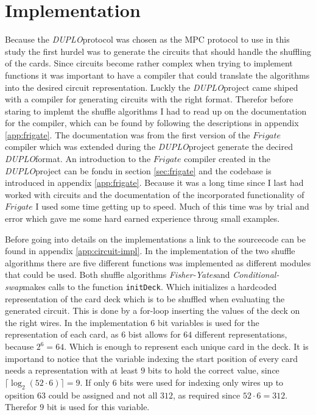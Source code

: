 \documentclass[twoside,11pt,openright]{report}
\newcommand{\FY}{\textit{Fisher-Yates}}
\newcommand{\CS}{\textit{Conditional-swap}}
\newcommand{\DUPLO}{\textit{DUPLO}}
\begin{document}
\section{Implementation}
\label{sec:cir_imp}
Because the \DUPLO protocol was chosen as the MPC protocol to use in this study the first hurdel was to generate the circuits that should handle the shuffling of the cards. Since circuits become rather complex when trying to implement functions it was important to have a compiler that could translate the algorithms into the desired circuit representation. Luckly the \DUPLO project came shiped with a compiler for generating circuits with the right format. Therefor before staring to implemt the shuffle algorithms I had to read up on the documentation for the compiler, which can be found by following the descriptions in appendix \ref{app:frigate}. The documentation was from the first version of the $Frigate$ compiler which was extended during the \DUPLO project generate the decired \DUPLO format. An introduction to the $Frigate$ compiler created in the \DUPLO project can be fondu in section \ref{sec:frigate} and the codebase is introduced in appendix \ref{app:frigate}. Because it was a long time since I last had worked with circuits and the documentation of the incorporated functionality of $Frigate$ I used some time getting up to speed. Much of this time was by trial and error which gave me some hard earned experience throug small examples.

\bigskip

Before going into details on the implementations a link to the sourcecode can be found in appendix \ref{app:circuit-impl}. In the implementation of the two shuffle algorithms there are five different functions was implemented as different modules that could be used. Both shuffle algorithms \FY and \CS makes calls to the function \verb|initDeck|. Which initializes a hardcoded representation of the card deck which is to be shuffled when evaluating the generated circuit. This is done by a for-loop inserting the values of the deck on the right wires. In the implementation $6$ bit variables is used for the representation of each card, as $6$ bist allows for $64$ different representations, because $2^6=64$. Which is enough to represent each unique card in the deck. It is importand to notice that the variable indexing the start position of every card needs a representation with at least $9$ bits to hold the correct value, since $\lceil \log_2(52\cdot 6)\rceil=9$. If only $6$ bits were used for indexing only wires up to opsition $63$ could be assigned and not all $312$, as required since $52\cdot 6=312$. Therefor $9$ bit is used for this variable.
\end{document}
